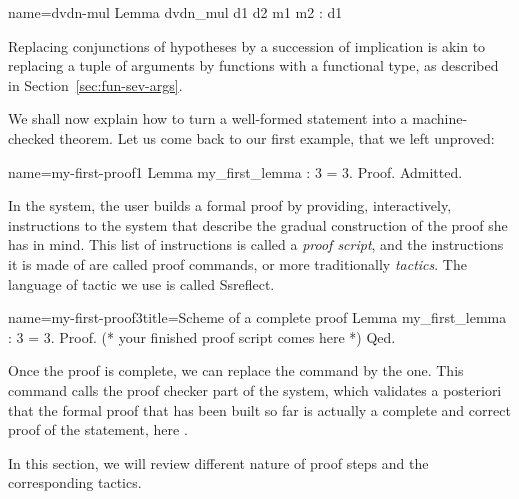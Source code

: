 \begin{coq}{name=dvdn-mul}{}
Lemma dvdn_mul d1 d2 m1 m2 : d1 %
\end{coq}
Replacing conjunctions of hypotheses by a succession of implication is
akin to replacing a tuple of arguments by functions with a functional
type, as described in Section~\ref{sec:fun-sev-args}.



We shall now explain how to turn a well-formed statement into a
machine-checked theorem. Let us come back to our first example, that
we left unproved:
\begin{coq}{name=my-first-proof1}{}
Lemma my_first_lemma : 3 = 3.
Proof.
Admitted.
\end{coq}
In the \Coq{} system, the user builds a formal proof by providing,
interactively, instructions to the \Coq{}
system that describe the gradual construction of the proof she has in
mind. This list of instructions is called a \emph{proof script}, and
the instructions it is made of are called proof commands, or more traditionally
\emph{tactics}.  The language of tactic we use is called
Ssreflect.

\begin{coq}{name=my-first-proof3}{title=Scheme of a complete proof}
Lemma my_first_lemma : 3 = 3.
Proof.
(* your finished proof script comes here *)
Qed.
\end{coq}

Once the proof is complete, we can replace the  command by
the  one. This command calls the proof checker part of  the \Coq{}
system, which validates a posteriori that the formal proof that has
been built so far is actually a complete and correct proof of the
statement, here .

In this section, we will review different nature of proof steps and
the corresponding tactics.

